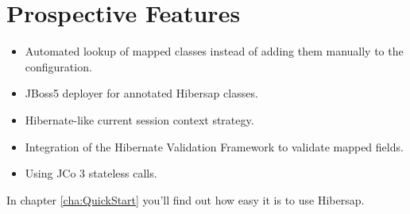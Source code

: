 \section*{Prospective Features}

\begin{itemize}
  \item Automated lookup of mapped classes instead of adding them manually to the configuration.
  \item JBoss5 deployer for annotated Hibersap classes.
  \item Hibernate-like current session context strategy.
  \item Integration of the Hibernate Validation Framework to validate mapped fields.  
  \item Using JCo 3 stateless calls.
\end{itemize}

In chapter \ref{cha:QuickStart} you'll find out how easy it is to use Hibersap.

